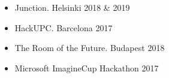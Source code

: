 
\begin{itemize}
    \item Junction. Helsinki 2018 \& 2019
    \item HackUPC. Barcelona 2017
    \item The Room of the Future. Budapest 2018 \faTrophy
    \item Microsoft ImagineCup Hackathon 2017
\end{itemize}